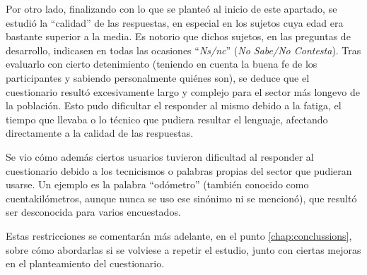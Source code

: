 Por otro lado, finalizando con lo que se planteó al inicio de este apartado, se
estudió la ``calidad'' de las respuestas, en especial en los sujetos cuya edad
era bastante superior a la media. Es notorio que dichos sujetos, en las preguntas
de desarrollo, indicasen en todas las ocasiones ``\textit{Ns/nc}'' (\textit{No Sabe/No Contesta}).
Tras evaluarlo con cierto detenimiento (teniendo en cuenta la buena fe de los
participantes y sabiendo personalmente quiénes son), se deduce que el cuestionario resultó
excesivamente largo y complejo para el sector
más longevo de la población. Esto pudo dificultar el responder al mismo debido
a la fatiga, el tiempo que llevaba o lo técnico que pudiera resultar el lenguaje,
afectando directamente a la calidad de las respuestas.

Se vio cómo además ciertos usuarios tuvieron dificultad al responder al cuestionario
debido a los tecnicismos o palabras propias del sector que pudieran usarse. Un
ejemplo es la palabra ``odómetro'' (también conocido como cuentakilómetros, aunque
nunca se uso ese sinónimo ni se mencionó), que resultó ser desconocida para varios encuestados.

Estas restricciones se comentarán más adelante, en el punto \ref{chap:conclussions},
sobre cómo abordarlas si se volviese a repetir el estudio, junto con ciertas mejoras
en el planteamiento del cuestionario.
